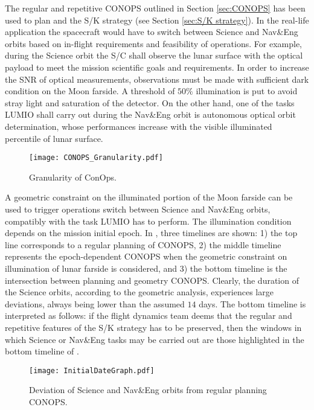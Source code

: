 \begin{figure*}[b!]
The regular and repetitive {CONOPS} outlined in Section \ref{sec:CONOPS} has been used to plan and the S/K strategy (see Section \ref{sec:S/K strategy}). In the real-life application the spacecraft would have to switch between Science and Nav\&Eng orbits based on in-flight requirements and feasibility of operations. For example, during the Science orbit the {S/C} shall observe the lunar surface with the optical payload to meet the mission scientific goals and requirements. In order to increase the {SNR} of optical measurements, observations must be made with sufficient dark condition on the Moon farside. A threshold of $50\%$ illumination is put to avoid stray light and saturation of the detector. On the other hand, one of the tasks LUMIO shall carry out during the Nav\&Eng orbit is autonomous optical orbit determination, whose performances increase with the visible illuminated percentile of lunar surface.
%
\begin{figure}[t!]
	\centering
	\texttt{[image: CONOPS\_Granularity.pdf]}
	\caption{Granularity of ConOps.}
	\label{fig:CONOPS_Granularity}
\end{figure}
%

A geometric constraint on the illuminated portion of the Moon farside can be used to trigger operations switch between Science and Nav\&Eng orbits, compatibly with the task LUMIO has to perform. The illumination condition depends on the mission initial epoch. In , three timelines are shown: 1) the top line corresponds to a regular planning of {CONOPS}, 2) the middle timeline represents the epoch-dependent {CONOPS} when the geometric constraint on illumination of lunar farside is considered, and 3) the bottom timeline is the intersection between planning and geometry {CONOPS}. Clearly, the duration of the Science orbits, according to the geometric analysis, experiences large deviations, always being lower than the assumed $14$ days. The bottom timeline is interpreted as follows: if the flight dynamics team deems that the regular and repetitive features of the S/K strategy has to be preserved, then the windows in which Science or Nav\&Eng tasks may be carried out are those highlighted in the bottom timeline of .
%
\begin{figure}[t!]
	\centering
	\texttt{[image: InitialDateGraph.pdf]}
	\caption[Deviations from regular ConOps planning.]{Deviation of Science and Nav\&Eng orbits from regular planning {CONOPS}.}
	\label{fig:InitialDateGraph}
\end{figure}
%


\end{figure*}
